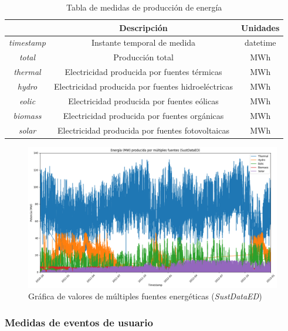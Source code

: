 \vspace{3mm}

\begin{table}[h!]
    \centering
    \begin{tabular}{|c|c|c|}
    \hline
    \rowcolor[HTML]{AAAAAA} 
    \multicolumn{1}{|c|}{\cellcolor[HTML]{AAAAAA}Campo} & \multicolumn{1}{c|}{\cellcolor[HTML]{AAAAAA}Descripción} & Unidades \\ \hline
    \textit{timestamp} & Instante temporal de medida & datetime \\ \hline
    \textit{total} & Producción total & MWh \\ \hline
    \textit{thermal} & Electricidad producida por fuentes térmicas & MWh \\ \hline
    \textit{hydro} & Electricidad producida por fuentes hidroeléctricas & MWh \\ \hline
    \textit{eolic} & Electricidad producida por fuentes eólicas & MWh \\ \hline
    \textit{biomass} & Electricidad producida por fuentes orgánicas & MWh \\ \hline
    \textit{solar} & Electricidad producida por fuentes fotovoltaicas & MWh \\ \hline
    \end{tabular}
    \caption{Tabla de medidas de producción de energía \cite{sustdata}}
    \label{tab:prod}
\end{table}

\begin{figure}[h!]
  \centering
  \includegraphics[width=1\textwidth]{img/diseno/matplotfuentes.png}
  \caption{Gráfica de valores de múltiples fuentes energéticas (\textit{SustDataED})}
  \label{fig:fuentes}
\end{figure}

\subsubsection{Medidas de eventos de usuario}

